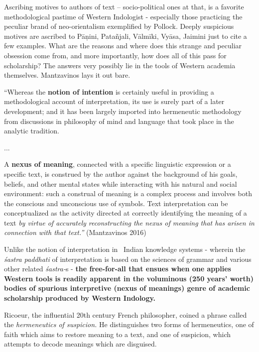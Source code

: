 Ascribing motives to authors of text – socio-political ones at that, is a favorite methodological pastime of Western Indologist - especially those practicing the peculiar brand of neo-orientalism exemplified by Pollock. Deeply suspicious motives are ascribed to Pāṇini, Patañjali, Vālmīki, Vyāsa, Jaimini just to cite a few examples. What are the reasons and where does this strange and peculiar obsession come from, and more importantly, how does all of this pass for scholarship? The answers very possibly lie in the tools of Western academia themselves. Mantzavinos lays it out bare.

\begin{myquote}
“Whereas the \textbf{notion of intention} is certainly useful in providing a methodological account of interpretation, its use is surely part of a later development; and it has been largely imported into hermeneutic methodology from discussions in philosophy of mind and language that took place in the analytic tradition.
\end{myquote}

\begin{myquote}
...
\end{myquote}

\begin{myquote}
A \textbf{nexus of meaning}, connected with a specific linguistic expression or a specific text, is construed by the author against the background of his goals, beliefs, and other mental states while interacting with his natural and social environment: such a construal of meaning is a complex process and involves both the conscious and unconscious use of symbols. Text interpretation can be conceptualized as the activity directed at correctly identifying the meaning of a text \textit{by virtue of accurately reconstructing the nexus of meaning that has arisen in connection with that text.” }\hfill (Mantzavinos 2016)
\end{myquote}

Unlike the notion of interpretation in  Indian knowledge systems - wherein the \textit{śastra paddhati} of interpretation is based on the sciences of grammar and various other related \textit{śastra-}s - \textbf{the free-for-all that ensues when one applies Western tools is readily apparent in the voluminous (250 years’ worth) bodies of spurious interpretive (nexus of meanings) genre of academic scholarship produced by Western Indology.}

Ricoeur, the influential 20th century French philosopher, coined a phrase called the \textit{hermeneutics of suspicion.} He distinguishes two forms of hermeneutics, one of faith which aims to restore meaning to a text, and one of suspicion, which attempts to decode meanings which are disguised.

